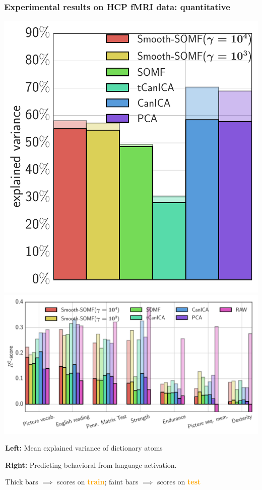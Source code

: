 \documentclass{beamer}
\def\mydot{\structure{\rule{1ex}{1ex}}\,}
\def\emph#1{\textbf{\textcolor{orange}{#1}}}
\begin{document}
\begin{frame}
  \frametitle{Experimental results on HCP fMRI data: quantitative}
  \includegraphics[width=.36\linewidth]{figures/ev_scores_LANGUAGE.pdf}
  \includegraphics[width=.7\linewidth]{figures/behavioral_scores_LANGUAGE.pdf}
  \bigskip

  \mydot \textbf{Left:} Mean explained variance of dictionary atoms
  
  \mydot \textbf{Right:} Predicting  behavioral  from language activation.
  
  \mydot Thick bars $\implies$ scores on \emph{train}; faint bars $\implies$ scores on \emph{test}


\end{frame}
\end{document}
